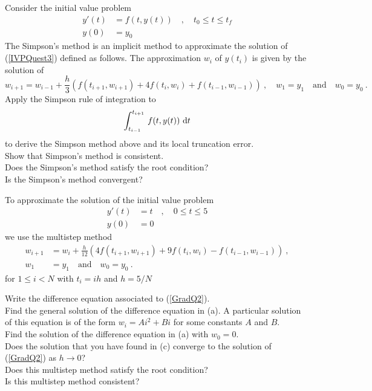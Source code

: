 \begin{question}
Consider the initial value problem
\begin{equation}
\begin{split}
y'(t) &= f(t,y(t)) \quad , \quad t_0 \leq t \leq t_f \\
y(0) &= y_0
\end{split} \label{IVPQuest3}
\end{equation}
The Simpson's method is an implicit method to approximate the solution
of (\ref{IVPQuest3}) defined as follows.  The approximation $w_i$ of
$y(t_i)$ is given by the solution of
\[
w_{i+1} = w_{i-1} + \frac{h}{3}\left( f(t_{i+1},w_{i+1}) + 4 
f(t_i,w_i) + f(t_{i-1},w_{i-1}) \right) \ , \quad
w_1 = y_1 \quad \text{and} \quad   w_0 = y_0 \ .
\]
 Apply the Simpson rule of integration to
\[
\int_{t_{i-1}}^{t_{i+1}}\, f(t,y(t))\,\,\mathrm{d}t
\]
to derive the Simpson method above and its local truncation error.\\
 Show that Simpson's method is consistent. \\
 Does the Simpson's method satisfy the root condition?\\
 Is the Simpson's method convergent?
\label{initQ15}
\end{question}


\begin{question}
To approximate the solution of the initial value problem
\begin{equation}\label{GradQ2}
\begin{split}
y'(t) &= t \quad , \quad 0 \leq t \leq 5 \\
y(0) &= 0
\end{split}
\end{equation}
we use the multistep method
\begin{align}
w_{i+1} &= w_i + \frac{h}{12}\left( 4 f(t_{i+1},w_{i+1}) +
  9 f(t_i,w_i) - f(t_{i-1},w_{i-1}) \right) \ ,  \label{GradQ1} \\
w_1 & = y_1 \quad \text{and} \quad w_0 = y_0 \ .  \nonumber
\end{align}
for $1\leq i <N$ with $t_i = i h$ and $h = 5/N$

 Write the difference equation associated to (\ref{GradQ2}).\\
 Find the general solution of the difference equation
in (a).  A particular solution of this equation is of the form
$w_i = A i^2 + B i$ for some constants $A$ and $B$.\\
 Find the solution of the difference equation in (a)
with $w_0 = 0$.\\
 Does the solution that you have found in (c) converge to the
solution of (\ref{GradQ2}) as $h\to 0$?\\
 Does this multistep method satisfy the root condition?\\
 Is this multistep method consistent?
\label{initQ16}
\end{question}

